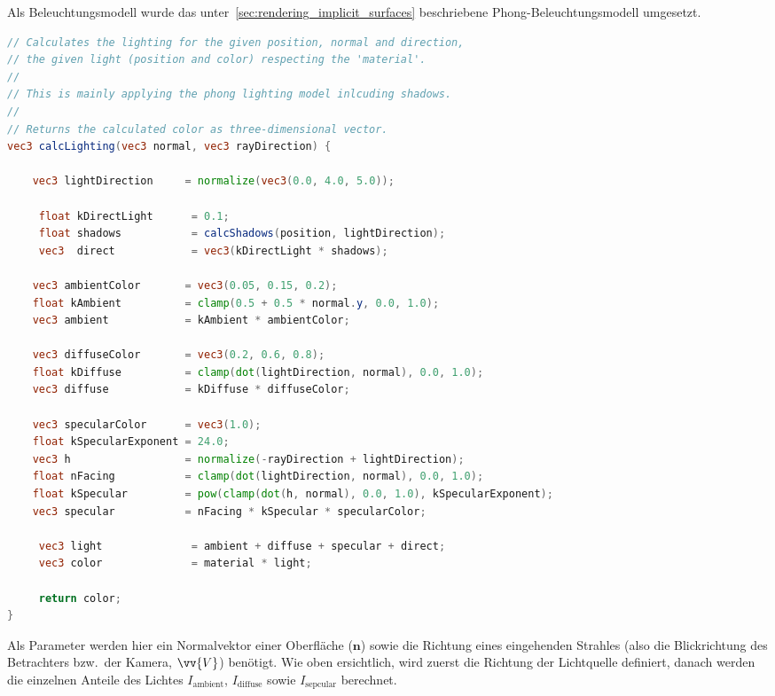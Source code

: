 Als Beleuchtungsmodell wurde das
unter~\autoref{sec:rendering_implicit_surfaces} beschriebene
Phong-Beleuchtungsmodell umgesetzt.

\begin{minipage}{\linewidth}
\begin{lstlisting}[language=GLSL,caption={Umsetzung des
        Phong-Beleuchtungsmodelles in
        GLSL.},label={alg:glsl_lighting},captionpos=b,emph={calcLighting}]
// Calculates the lighting for the given position, normal and direction,
// the given light (position and color) respecting the 'material'.
//
// This is mainly applying the phong lighting model inlcuding shadows.
//
// Returns the calculated color as three-dimensional vector.
vec3 calcLighting(vec3 normal, vec3 rayDirection) {

    vec3 lightDirection     = normalize(vec3(0.0, 4.0, 5.0));

     float kDirectLight      = 0.1;
     float shadows           = calcShadows(position, lightDirection);
     vec3  direct            = vec3(kDirectLight * shadows);

    vec3 ambientColor       = vec3(0.05, 0.15, 0.2);
    float kAmbient          = clamp(0.5 + 0.5 * normal.y, 0.0, 1.0);
    vec3 ambient            = kAmbient * ambientColor;

    vec3 diffuseColor       = vec3(0.2, 0.6, 0.8);
    float kDiffuse          = clamp(dot(lightDirection, normal), 0.0, 1.0);
    vec3 diffuse            = kDiffuse * diffuseColor;

    vec3 specularColor      = vec3(1.0);
    float kSpecularExponent = 24.0;
    vec3 h                  = normalize(-rayDirection + lightDirection);
    float nFacing           = clamp(dot(lightDirection, normal), 0.0, 1.0);
    float kSpecular         = pow(clamp(dot(h, normal), 0.0, 1.0), kSpecularExponent);
    vec3 specular           = nFacing * kSpecular * specularColor;

     vec3 light              = ambient + diffuse + specular + direct;
     vec3 color              = material * light;
 
     return color;
}
\end{lstlisting}
\end{minipage}

Als Parameter werden hier ein Normalvektor einer Oberfläche ($\bm{n}$)
sowie die Richtung eines eingehenden Strahles (also die Blickrichtung
des Betrachters bzw.\ der Kamera, $\vv{V}$) benötigt.
Wie oben ersichtlich, wird zuerst die Richtung der Lichtquelle definiert,
danach werden die einzelnen Anteile des Lichtes $I_{\text{ambient}}$,
$I_{\text{diffuse}}$ sowie $I_{\text{sepcular}}$ berechnet.

